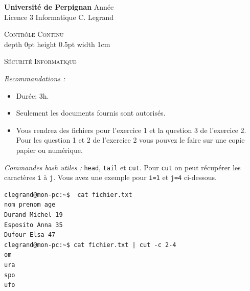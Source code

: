 \documentclass[a4paper,9pt]{article}
\newenvironment{terminal}{\color{black}\begin{snugshade*}}
{\end{snugshade*}\color{black}}
\theoremstyle{plain}
\theoremstyle{definition}
\begin{document}
\hbox{}
\noindent \textbf{Université de Perpignan} \hfill  Année \the\year \\
Licence 3 Informatique \hfill C. Legrand \\

\begin{center}
  {  {\scshape \large Contrôle Continu  } \\
    \vrule depth 0pt height 0.5pt width 1cm
    \medskip
    
{\scshape    S\'ecurit\'e Informatique}  \\
}
\end{center}
\hbox{}

\bigskip

\bigskip


\noindent\textit{Recommandations :}
\begin{itemize}
\item Durée: 3h.
\item Seulement les documents fournis sont autorisés.
  \item Vous rendrez des fichiers pour l'exercice 1 et la question 3 de l'exercice 2. Pour les question 1 et 2 de l'exercice 2 vous pouvez le faire sur une copie papier ou numérique. 
  \end{itemize}
\noindent\textit{Commandes bash utiles :} \verb|head|, \verb|tail| et \verb|cut|. Pour \verb|cut| on peut récupérer les caractères \verb|i| à \verb|j|. Vous avez une exemple pour \verb|i=1| et \verb|j=4| ci-dessous.
\begin{small}
\begin{terminal}
\begin{verbatim}
clegrand@mon-pc:~$  cat fichier.txt 
nom prenom age
Durand Michel 19
Esposito Anna 35
Dufour Elsa 47
clegrand@mon-pc:~$ cat fichier.txt | cut -c 2-4
om 
ura
spo
ufo
\end{verbatim}
\end{terminal}
\end{small}
\end{document}
